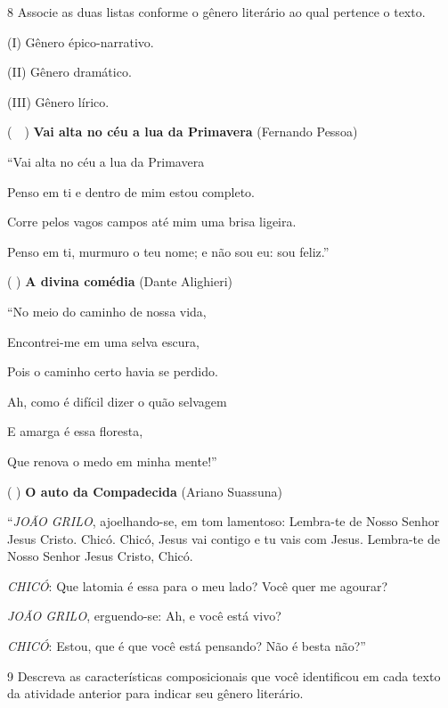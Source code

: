 \pagebreak

\num{8} Associe as duas listas conforme o gênero literário ao qual
pertence o texto.

(I) Gênero épico-narrativo. 

(II) Gênero dramático.

(III) Gênero lírico.


\bigskip

(~~) \textbf{Vai alta no céu a lua da Primavera} (Fernando
Pessoa)

``Vai alta no céu a lua da Primavera

Penso em ti e dentro de mim estou completo.

Corre pelos vagos campos até mim uma brisa ligeira.

Penso em ti, murmuro o teu nome; e não sou eu: sou feliz.''

\medskip

(  ) \textbf{A divina comédia} (Dante Alighieri)

``No meio do caminho de nossa vida,

Encontrei-me em uma selva escura,

Pois o caminho certo havia se perdido.

Ah, como é difícil dizer o quão selvagem

E amarga é essa floresta,

Que renova o medo em minha mente!''

\medskip

(  ) \textbf{O auto da Compadecida} (Ariano Suassuna)

``\textit{JOÃO GRILO}, ajoelhando-se, em tom lamentoso: Lembra-te de
Nosso Senhor Jesus Cristo. Chicó. Chicó, Jesus vai contigo e tu vais com
Jesus. Lembra-te de Nosso Senhor Jesus Cristo, Chicó.

\textit{CHICÓ}: Que latomia
é essa para o meu lado? Você quer me agourar?

\textit{JOÃO GRILO}, erguendo-se:
Ah, e você está vivo?

\textit{CHICÓ}: Estou, que é que você está pensando? Não é
besta não?''

\bigskip

\num{9} Descreva as características composicionais que você identificou
em cada texto da atividade anterior para indicar seu gênero literário.

